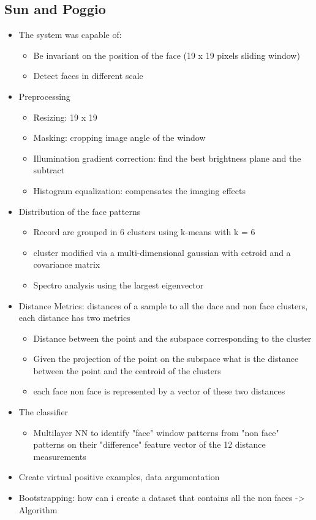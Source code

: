 \documentclass[12pt,oneside]{report}
\begin{document}
\subsection{Sun and Poggio}
\begin{itemize}
    \item The system was capable of:
    \begin{itemize}
        \item Be invariant on the position of the face (19 x 19 pixels sliding window)
        \item Detect faces in different scale
    \end{itemize}
    \item Preprocessing
    \begin{itemize}
        \item Resizing: 19 x 19
        \item Masking: cropping image angle of the window
        \item Illumination gradient correction: find the best brightness plane and the subtract
        \item Histogram equalization: compensates the imaging effects
    \end{itemize}
    \item Distribution of the face patterns
    \begin{itemize}
        \item Record are grouped in 6 clusters using k-means with k = 6
        \item cluster modified via a multi-dimensional gaussian with cetroid and a covariance matrix
        \item Spectro analysis using the largest eigenvector
    \end{itemize}
    \item Distance Metrics: distances of a sample to all the dace and non face clusters, each distance has two metrics
    \begin{itemize}
        \item Distance between the point and the subspace corresponding to the cluster
        \item Given the projection of the point on the subspace what is the distance between the point and the centroid of the clusters
        \item each face non face is represented by a vector of these two distances
    \end{itemize}
    \item The classifier
    \begin{itemize}
        \item Multilayer NN to identify "face" window patterns from "non face" patterns on their "difference" feature vector of the 12 distance measurements
    \end{itemize}
    \item Create virtual positive examples, data argumentation
    \item Bootstrapping: how can i create a dataset that contains all the non faces -> Algorithm
\end{itemize}
\end{document}
